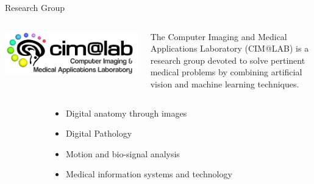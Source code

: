 \documentclass[usenames,dvipsnames]{beamer}
\begin{document}
\begin{frame}{Research Group}
\vspace{0.5cm}
\begin{columns}
\begin{column}{0.2\textwidth}
\includegraphics[width=\textwidth]{graphics/cimalablogo.png}
\end{column}
\begin{column}{0.8\textwidth}
The Computer Imaging and Medical Applications Laboratory (CIM@LAB) is a research group devoted to solve pertinent medical problems by combining artificial vision and machine learning techniques.
\end{column}
\end{columns}

\begin{columns}
\begin{column}{0.33\textwidth}
\end{column}
\begin{column}{0.33\textwidth}

\begin{itemize}
\item<3-> Digital anatomy through images
\item<4->  Digital Pathology
\item<5->  Motion and bio-signal analysis
\item<6->  Medical information systems and technology
\end{itemize}

\end{column}

\vspace{1cm}
\begin{column}{0.33\textwidth}
\\
\end{column}
\end{columns}
\end{frame}
\end{document}
